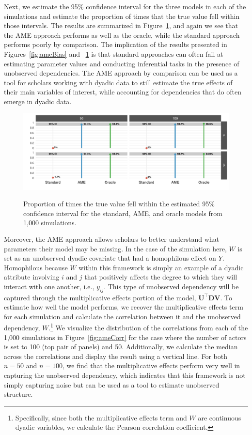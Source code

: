 Next, we estimate the 95\% confidence interval for the three models in each of the simulations and estimate the proportion of times that the true value fell within those intervals. The results are summarized in Figure~\ref{fig:ameCalib}, and again we see that the AME approach performs as well as the oracle, while the standard approach performs poorly by comparison. The implication of the results presented in Figures~\ref{fig:ameBias} and ~\ref{fig:ameCalib} is that standard approaches can often fail at estimating parameter values and conducting inferential tasks in the presence of unobserved dependencies. The AME approach by comparison can be used as a tool for scholars working with dyadic data to still estimate the true effects of their main variables of interest, while accounting for dependencies that do often emerge in dyadic data. 

\begin{figure}
	\centering
	\caption{Proportion of times the true value fell within the estimated 95\% confidence interval for the standard, AME, and oracle models from 1,000 simulations.}
	\label{fig:ameCalib}
	\includegraphics[width=1\textwidth]{graphics/ameSimCover_all.pdf} \\
\end{figure}

Moreover, the AME approach allows scholars to better understand what parameters their model may be missing. In the case of the simulation here, $W$ is set as an unobserved dyadic covariate that had a homophilous effect on $Y$. Homophilous because $W$ within this framework is simply an example of a dyadic attribute involving $i$ and $j$ that positively affects the degree to which they will interact with one another, i.e., $y_{ij}$. This type of unobserved dependency will be captured through the multiplicative effects portion of the model, $\mathbf{U}^{\top} \mathbf{D} \mathbf{V}$. To estimate how well the model performs, we recover the multiplicative effects term for each simulation and calculate the correlation between it and the unobserved dependency, $W$.\footnote{Specifically, since both the multiplicative effects term and $W$ are continuous dyadic variables, we calculate the Pearson correlation coefficient.} We visualize the distribution of the correlations from each of the 1,000 simulations in Figure~\ref{fig:ameCorr} for the case where the number of actors is set to 100 (top pair of panels) and 50. Additionally, we calculate the median across the correlations and display the result using a vertical line. For both $n=50$ and $n=100$, we find that the multiplicative effects perform very well in capturing the unobserved dependency, which indicates that this framework is not simply capturing noise but can be used as a tool to estimate unobserved structure. 

